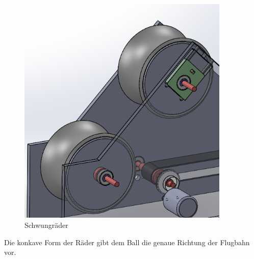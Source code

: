 \begin{figure}[h!]
	\centering
	\includegraphics[width=0.9\textwidth]{Enddokumentation/Loesungskonzept/Bilder/Schwungraeder.png}
	\caption{Schwungräder}
	\label{fig:Schwungräder}	
\end{figure}
Die konkave Form der Räder gibt dem Ball die genaue Richtung der Flugbahn vor.
